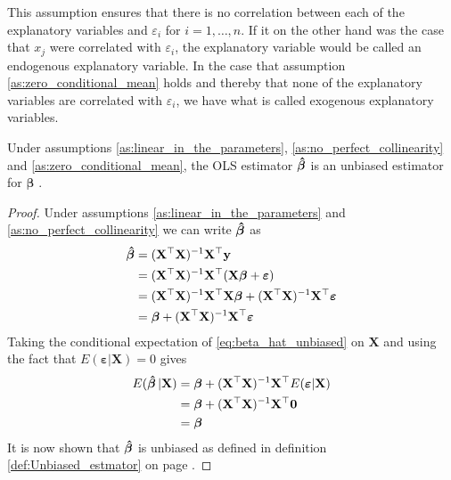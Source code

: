 This assumption ensures that there is no correlation between each of the explanatory variables and $\varepsilon_i$ for $i = 1, \ldots, n$.
If it on the other hand was the case that $x_j$ were correlated with $\varepsilon_i$, the explanatory variable would be called an endogenous explanatory variable.
In the case that assumption \ref{as:zero_conditional_mean} holds and thereby that none of the explanatory variables are correlated with $\varepsilon_i$, we have what is called exogenous explanatory variables.
\begin{theorem}\label{th:unbiasedness_of_ols}
    Under assumptions \ref{as:linear_in_the_parameters}, \ref{as:no_perfect_collinearity} and \ref{as:zero_conditional_mean}, the OLS estimator $\operatorname{\boldsymbol{\hat{\beta}}}$ is an unbiased estimator for $\boldsymbol{\beta}$ \cite[p. 810]{Wooldridge2012}.
\end{theorem}
\begin{proof}
    Under assumptions \ref{as:linear_in_the_parameters} and \ref{as:no_perfect_collinearity} we can write $\operatorname{\boldsymbol{\hat{\beta}}}$ as
    \begin{align}
        \operatorname{\boldsymbol{\hat{\beta}}} &= (\mathbf{X}^\top\mathbf{X})^{-1}\mathbf{X}^\top\mathbf{y} \nonumber\\
        &= (\mathbf{X}^\top\mathbf{X})^{-1}\mathbf{X}^\top(\mathbf{X}\boldsymbol{\beta} + \boldsymbol{\varepsilon}) \nonumber\\
        &=(\mathbf{X}^\top\mathbf{X})^{-1}\mathbf{X}^\top\mathbf{X}\boldsymbol{\beta} + (\mathbf{X}^\top\mathbf{X})^{-1}\mathbf{X}^\top\boldsymbol{\varepsilon} \nonumber\\
        &= \boldsymbol{\beta} + (\mathbf{X}^\top\mathbf{X})^{-1}\mathbf{X}^\top\boldsymbol{\varepsilon} \label{eq:beta_hat_unbiased}
    \end{align}
    Taking the conditional expectation of \eqref{eq:beta_hat_unbiased} on $\mathbf{X}$ and using the fact that $E(\boldsymbol{\varepsilon} | \mathbf{X}) = 0$ gives
    \begin{align*}
        E(\operatorname{\boldsymbol{\hat{\beta}}} | \mathbf{X}) &= \boldsymbol{\beta} + (\mathbf{X}^\top\mathbf{X})^{-1}\mathbf{X}^\top E(\boldsymbol{\varepsilon} | \mathbf{X}) \\
        &= \boldsymbol{\beta} + (\mathbf{X}^\top\mathbf{X})^{-1}\mathbf{X}^\top \mathbf{0} \\
        &= \boldsymbol{\beta}
    \end{align*}
    It is now shown that $\operatorname{\boldsymbol{\hat{\beta}}}$ is unbiased as defined in definition \ref{def:Unbiased_estmator} on page \pageref{def:Unbiased_estmator}.
\end{proof}

